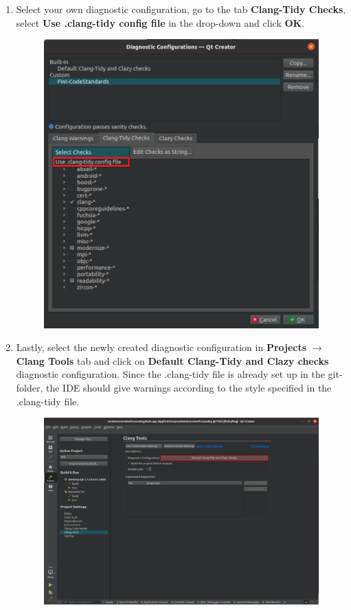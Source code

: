 \documentclass[10pt]{article}
\begin{document}
\begin{enumerate}
\item Select your own diagnostic configuration, go to the tab \textbf{Clang-Tidy Checks}, select \textbf{Use .clang-tidy config
file} in the drop-down and click \textbf{OK}.
\begin{figure}[h!]
\centering
\includegraphics[width=0.6 \textwidth]{clang-tidy7.png}
\end{figure}

\newpage

\item Lastly, select the newly created diagnostic configuration in \textbf{Projects} $\rightarrow$ \textbf{Clang Tools} tab and click on \textbf{Default Clang-Tidy and Clazy checks} diagnostic configuration. Since the .clang-tidy file is already set up in the git-folder, the IDE should give warnings according to the style specified in the .clang-tidy file.
\begin{figure}[h!]
\centering
\includegraphics[width=0.65 \textwidth]{clang-tidy8.png}
\end{figure}


\end{enumerate}
\end{document}
